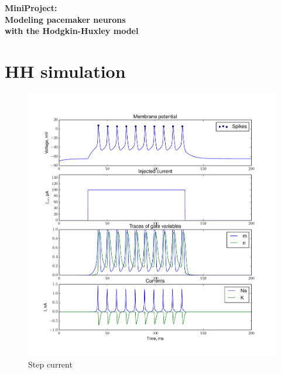 \documentclass[a4paper,11pt]{article} %
\begin{document}
\begin{center}
    \bfseries\Large
    MiniProject:\\
    Modeling pacemaker neurons\\
    with the Hodgkin-Huxley model

\end{center}

\section{HH simulation}

\begin{figure}[H]
    \centering
    \includegraphics[width=\textwidth]{step_cur}
    \caption{Step current}
    \label{fig:step}
\end{figure}
\end{document}
